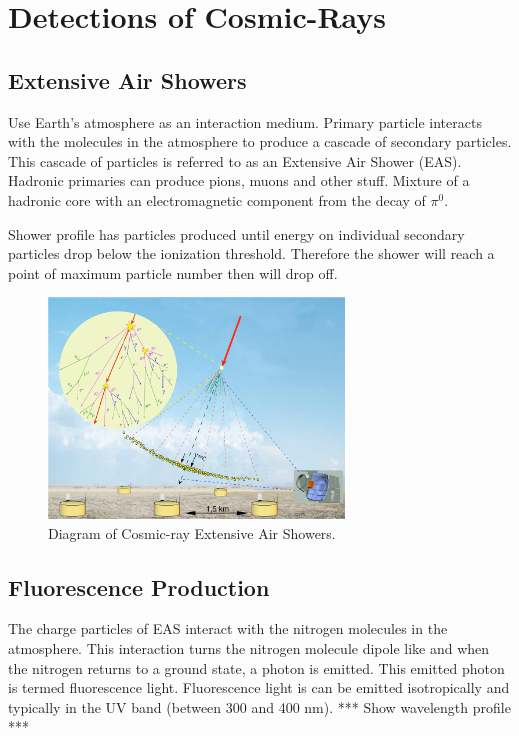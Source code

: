 \chapter[Detection of Cosmic-rays]{\centering Detections of Cosmic-Rays \\}\label{Ch:CR_Detection}

\section{Extensive Air Showers}

Use Earth's atmosphere as an interaction medium.
Primary particle interacts with the molecules in the atmosphere to produce a cascade of secondary particles. This cascade of particles is referred to as an Extensive Air Shower (EAS).
Hadronic primaries can produce pions, muons and other stuff.
Mixture of a hadronic core with an electromagnetic component from the decay of $\pi^{0}$.

Shower profile has particles produced until energy on individual secondary particles drop below the ionization threshold. Therefore the shower will reach a point of maximum particle number then will drop off.

\begin{figure}
\centering
\includegraphics[width=0.7\textwidth]{chapters/pix/CR_ExtensiveAirShowers.png}
\caption{Diagram of Cosmic-ray Extensive Air Showers.}
\end{figure}

\section{Fluorescence Production}

The charge particles of EAS interact with the nitrogen molecules in the atmosphere. This interaction turns the nitrogen molecule dipole like and when the nitrogen returns to a ground state, a photon is emitted. This emitted photon is termed fluorescence light. Fluorescence light is can be emitted isotropically and typically in the UV band (between 300 and 400 nm). *** Show wavelength profile ***



